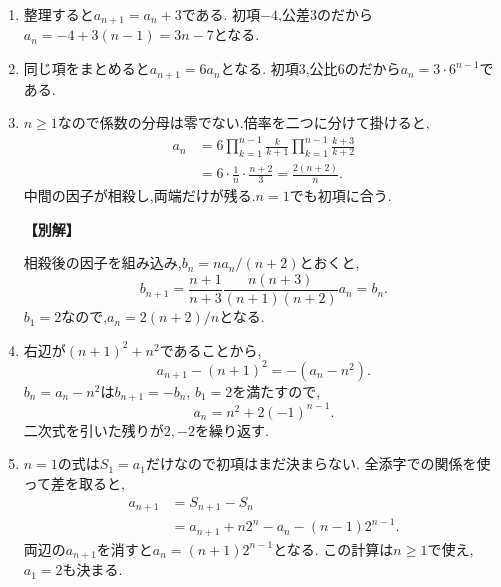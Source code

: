 \begin{enumerate}[label=\textbf{問\arabic*.},leftmargin=3.8em,format=\bookitemlink{practice-basic}{solution}{problem}]
          \item 整理すると$a_{n+1}=a_n+3$である.
                  初項$-4$,公差$3$のだから$a_n=-4+3(n-1)=3n-7$となる.

          \item 同じ項をまとめると$a_{n+1}=6a_n$となる.
                  初項$3$,公比$6$のだから$a_n=3\cdot6^{n-1}$である.

          \item $n\ge1$なので係数の分母は零でない.倍率を二つに分けて掛けると,
                  \[
                  \begin{aligned}
                    a_n&=6\prod_{k=1}^{n-1}\frac{k}{k+1}
                            \prod_{k=1}^{n-1}\frac{k+3}{k+2}\\
                       &=6\cdot\frac1n\cdot\frac{n+2}3
                        =\frac{2(n+2)}n.
                  \end{aligned}
                  \]
                  中間の因子が相殺し,両端だけが残る.$n=1$でも初項に合う.
                  \par\smallskip\noindent\textbf{【別解】}\par
                  相殺後の因子を組み込み,$b_n=na_n/(n+2)$とおくと,
                  \[
                    b_{n+1}=\frac{n+1}{n+3}
                      \frac{n(n+3)}{(n+1)(n+2)}a_n=b_n.
                  \]
                  $b_1=2$なので,$a_n=2(n+2)/n$となる.

          \item 右辺が$(n+1)^2+n^2$であることから,
                  \[
                    a_{n+1}-(n+1)^2=-(a_n-n^2).
                  \]
                  $b_n=a_n-n^2$は$b_{n+1}=-b_n$, $b_1=2$を満たすので,
                  \[
                    a_n=n^2+2(-1)^{n-1}.
                  \]
                  二次式を引いた残りが$2,-2$を繰り返す.

          \item $n=1$の式は$S_1=a_1$だけなので初項はまだ決まらない.
                  全添字での関係を使って差を取ると,
                  \[
                  \begin{aligned}
                    a_{n+1}&=S_{n+1}-S_n\\
                       &=a_{n+1}+n2^n-a_n-(n-1)2^{n-1}.
                  \end{aligned}
                  \]
                  両辺の$a_{n+1}$を消すと$a_n=(n+1)2^{n-1}$となる.
                  この計算は$n\ge1$で使え,$a_1=2$も決まる.


\end{enumerate}
